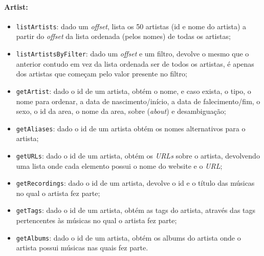 \documentclass{article}
\begin{document}
\paragraph{\textbf{Artist:}}
    \begin{itemize}
        \item \texttt{listArtists}: dado um \textit{offset}, lista os 50 artistas (id e nome do artista) a partir do \textit{offset} da lista ordenada (pelos nomes) de todas os artistas;
        \item \texttt{listArtistsByFilter}: dado um \textit{offset} e um filtro, devolve o mesmo que o anterior contudo em vez da lista ordenada ser de todos os artistas, é apenas dos artistas que começam pelo valor presente no filtro;
        \item \texttt{getArtist}: dado o id de um artista, obtém o nome, e caso exista, o tipo, o nome para ordenar, a data de nascimento/início, a data de falecimento/fim, o sexo, o id da area, o nome da area, sobre (\textit{about}) e desambiguação;
        \item \texttt{getAliases}: dado o id de um artista obtém os nomes alternativos para o artista;
        \item \texttt{getURLs}: dado o id de um artista, obtém os \textit{URLs} sobre o artista, devolvendo uma lista onde cada elemento possui o nome do website e o \textit{URL};
        \item \texttt{getRecordings}: dado o id de um artista, devolve o id e o título das músicas no qual o artista fez parte;
        \item \texttt{getTags}: dado o id de um artista, obtém as tags do artista, através das tags pertencentes às músicas no qual o artista fez parte;
        \item \texttt{getAlbums}: dado o id de um artista, obtém os albums do artista onde o artista possui músicas nas quais fez parte.
    \end{itemize}
\end{document}
